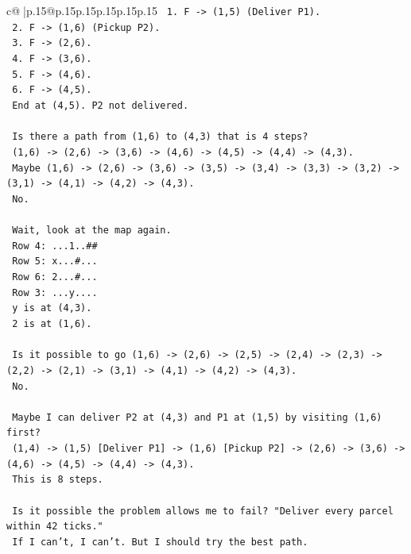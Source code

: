 \documentclass{article}
\begin{document}
{\begin{supertabular}{c@{$\;$}|p{.15\linewidth}@{}p{.15\linewidth}p{.15\linewidth}p{.15\linewidth}p{.15\linewidth}p{.15\linewidth}}
{{{\texttt{   1. F {-}> (1,5) (Deliver P1).} \\
\texttt{   2. F {-}> (1,6) (Pickup P2).} \\
\texttt{   3. F {-}> (2,6).} \\
\texttt{   4. F {-}> (3,6).} \\
\texttt{   5. F {-}> (4,6).} \\
\texttt{   6. F {-}> (4,5).} \\
\texttt{   End at (4,5). P2 not delivered.} \\
\\ 
\texttt{   Is there a path from (1,6) to (4,3) that is 4 steps?} \\
\texttt{   (1,6) {-}> (2,6) {-}> (3,6) {-}> (4,6) {-}> (4,5) {-}> (4,4) {-}> (4,3).} \\
\texttt{   Maybe (1,6) {-}> (2,6) {-}> (3,6) {-}> (3,5) {-}> (3,4) {-}> (3,3) {-}> (3,2) {-}> (3,1) {-}> (4,1) {-}> (4,2) {-}> (4,3).} \\
\texttt{   No.} \\
\\ 
\texttt{   Wait, look at the map again.} \\
\texttt{   Row 4: ...1..\#\#} \\
\texttt{   Row 5: x...\#...} \\
\texttt{   Row 6: 2...\#...} \\
\texttt{   Row 3: ...y....} \\
\texttt{   y is at (4,3).} \\
\texttt{   2 is at (1,6).} \\
\\ 
\texttt{   Is it possible to go (1,6) {-}> (2,6) {-}> (2,5) {-}> (2,4) {-}> (2,3) {-}> (2,2) {-}> (2,1) {-}> (3,1) {-}> (4,1) {-}> (4,2) {-}> (4,3).} \\
\texttt{   No.} \\
\\ 
\texttt{   Maybe I can deliver P2 at (4,3) and P1 at (1,5) by visiting (1,6) first?} \\
\texttt{   (1,4) {-}> (1,5) {[}Deliver P1{]} {-}> (1,6) {[}Pickup P2{]} {-}> (2,6) {-}> (3,6) {-}> (4,6) {-}> (4,5) {-}> (4,4) {-}> (4,3).} \\
\texttt{   This is 8 steps.} \\
\\ 
\texttt{   Is it possible the problem allows me to fail? "Deliver every parcel within 42 ticks."} \\
\texttt{   If I can't, I can't. But I should try the best path.} \\
}}}
\end{supertabular}}
\end{document}
